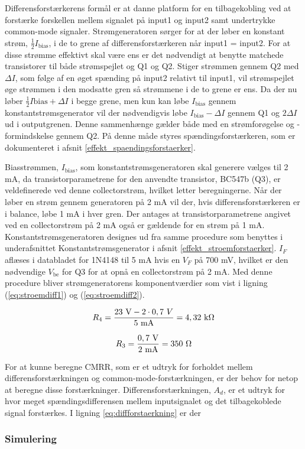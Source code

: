 Differensforstærkerens formål er at danne platform for en tilbagekobling ved at forstærke forskellen mellem signalet på input1 og input2 samt undertrykke common-mode signaler. Strømgeneratoren sørger for at der løber en konstant strøm, $\frac{1}{2}I_\mathrm{bias}$, i de to grene af differensforstærkeren når input1 = input2. For at disse strømme effektivt skal være ens er det nødvendigt at benytte matchede transistorer til både strømspejlet og Q1 og Q2. Stiger strømmen gennem Q2 med $\Delta I$, som følge af en øget spænding på input2 relativt til input1, vil strømspejlet øge strømmen i den modsatte gren så strømmene i de to grene er ens. Da der nu løber $\frac{1}{2}I\mathrm{bias} + \Delta I$ i begge grene, men kun kan løbe $I_\mathrm{bias}$ gennem konstantstrømsgenerator vil der nødvendigvis løbe $I_\mathrm{bias} -\Delta I$ gennem Q1 og $2\Delta I$ ud i outputgrenen. Denne sammenhænge gælder både med en strømforøgelse og -formindskelse gennem Q2. På denne måde styres spændingsforstærkeren, som er dokumenteret i afsnit \ref{effekt_spaendingsforstaerker}. 

Biasstrømmen, $I_\mathrm{bias}$, som konstantstrømsgeneratoren skal generere vælges til 2 mA, da transistorparametrene for den anvendte transistor, BC547b (Q3), er veldefinerede ved denne collectorstrøm, hvilket letter beregningerne. Når der løber en strøm gennem generatoren på 2 mA vil der, hvis differensforstærkeren er i balance, løbe 1 mA i hver gren. Der antages at transistorparametrene angivet ved en collectorstrøm på 2 mA også er gældende for en strøm på 1 mA. 
Konstantstrømsgeneratoren designes ud fra samme procedure som benyttes i underafsnittet Konstantstrømsgenerator i afsnit \ref{effekt_stroemforstaerker}. $I_F$ aflæses i databladet for 1N4148 til 5 mA hvis en $V_F$ på 700 mV, hvilket er den nødvendige $V_\mathrm{be}$ for Q3 for at opnå en collectorstrøm på 2 mA. Med denne procedure bliver strømgeneratorens komponentværdier som vist i ligning (\ref{eq:stroemdiff1}) og (\ref{eq:stroemdiff2}).

\begin{equation}
\label{eq:stroemdiff1}
R_4=\frac{23~\mathrm{V}-2 \cdot 0,7~V}{5~\mathrm{mA}}=4,32~\mathrm{k}\ohm
\end{equation}

\begin{equation}
\label{eq:stroemdiff2}
R_3=\frac{0,7~\mathrm{V}}{2~\mathrm{mA}}=350~\ohm
\end{equation}

For at kunne beregne CMRR, som er et udtryk for forholdet mellem differensforstærkningen og common-mode-forstærkningen, er der behov for netop at beregne disse forstærkninger. 
Differensforstærkningen, $A_d$, er et udtryk for hvor meget spændingsdifferensen mellem inputsignalet og det tilbagekoblede signal forstærkes. I ligning \ref{eq:diffforstaerkning} er der 


\subsubsection*{Simulering}